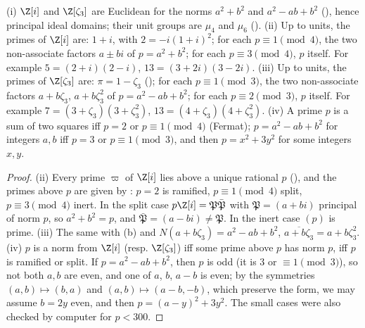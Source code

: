 \begin{proposition}\label{prop:ant:gausseisenstein}
(i) $\Z[i]$ and $\Z[\zeta_3]$ are Euclidean for the norms $a^2+b^2$ and $a^2-ab+b^2$ (), hence principal ideal domains; their unit groups are
$\mu_4$ and $\mu_6$ ().
(ii) Up to units, the primes of $\Z[i]$ are: $1+i$, with $2=-i(1+i)^2$; for each $p\equiv1\pmod4$, the two non-associate factors $a\pm bi$ of $p=a^2+b^2$;
for each $p\equiv3\pmod4$, $p$ itself. For example $5=(2+i)(2-i)$, $13=(3+2i)(3-2i)$.
(iii) Up to units, the primes of $\Z[\zeta_3]$ are: $\pi=1-\zeta_3$ (); for each $p\equiv1\pmod3$, the two non-associate factors
$a+b\zeta_3$, $a+b\zeta_3^2$ of $p=a^2-ab+b^2$; for each $p\equiv2\pmod3$, $p$ itself. For example $7=(3+\zeta_3)(3+\zeta_3^2)$, $13=(4+\zeta_3)(4+\zeta_3^2)$.
(iv) A prime $p$ is a sum of two squares iff $p=2$ or $p\equiv1\pmod4$ (Fermat); $p=a^2-ab+b^2$ for integers $a,b$ iff $p=3$ or $p\equiv1\pmod3$, and then
$p=x^2+3y^2$ for some integers $x,y$.
\end{proposition}

\begin{proof}
(ii) Every prime $\varpi$ of $\Z[i]$ lies above a unique rational $p$ (), and the primes above $p$ are given by
: $p=2$ is ramified, $p\equiv1\pmod4$ split, $p\equiv3\pmod4$ inert. In the split case $p\Z[i]=\mathfrak P\bar{\mathfrak P}$ with
$\mathfrak P=(a+bi)$ principal of norm $p$, so $a^2+b^2=p$, and $\bar{\mathfrak P}=(a-bi)\ne\mathfrak P$. In the inert case $(p)$ is prime. (iii) The same with
(b) and $N(a+b\zeta_3)=a^2-ab+b^2$, $\overline{a+b\zeta_3}=a+b\zeta_3^2$. (iv) $p$ is a norm from $\Z[i]$ (resp. $\Z[\zeta_3]$) iff some
prime above $p$ has norm $p$, iff $p$ is ramified or split. If $p=a^2-ab+b^2$, then $p$ is odd (it is $3$ or $\equiv1\pmod3$), so not both $a,b$ are even, and one of $a$, $b$, $a-b$ is
even; by the symmetries $(a,b)\mapsto(b,a)$ and $(a,b)\mapsto(a-b,-b)$, which preserve the form, we may assume $b=2y$ even, and then
$p=(a-y)^2+3y^2$. The small cases were also checked by computer for $p<300$.
\end{proof}

